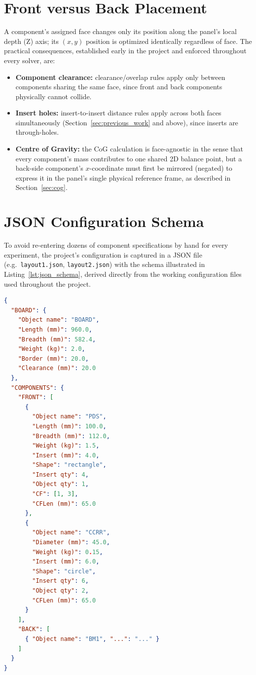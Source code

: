 \documentclass[11pt,a4paper,oneside]{report}
\begin{document}
\section{Front versus Back Placement}
A component's assigned face changes only its position along the panel's local depth (Z) axis; its $(x, y)$ position is optimized identically regardless of face. The practical consequences, established early in the project and enforced throughout every solver, are:
\begin{itemize}
    \item \textbf{Component clearance:} clearance/overlap rules apply only between components sharing the same face, since front and back components physically cannot collide.
    \item \textbf{Insert holes:} insert-to-insert distance rules apply across both faces simultaneously (Section~\ref{sec:previous_work} and above), since inserts are through-holes.
    \item \textbf{Centre of Gravity:} the CoG calculation is face-agnostic in the sense that every component's mass contributes to one shared 2D balance point, but a back-side component's $x$-coordinate must first be mirrored (negated) to express it in the panel's single physical reference frame, as described in Section~\ref{sec:cog}.
\end{itemize}

\section{JSON Configuration Schema}
\label{sec:json_schema}
To avoid re-entering dozens of component specifications by hand for every experiment, the project's configuration is captured in a JSON file (e.g.\ \texttt{layout1.json}, \texttt{layout2.json}) with the schema illustrated in Listing~\ref{lst:json_schema}, derived directly from the working configuration files used throughout the project.

\begin{lstlisting}[language=json, caption={Excerpt of the JSON board/component configuration schema (from \texttt{DE/layout1.json})}, label={lst:json_schema}]
{
  "BOARD": {
    "Object name": "BOARD",
    "Length (mm)": 960.0,
    "Breadth (mm)": 582.4,
    "Weight (kg)": 2.0,
    "Border (mm)": 20.0,
    "Clearance (mm)": 20.0
  },
  "COMPONENTS": {
    "FRONT": [
      {
        "Object name": "PDS",
        "Length (mm)": 100.0,
        "Breadth (mm)": 112.0,
        "Weight (kg)": 1.5,
        "Insert (mm)": 4.0,
        "Shape": "rectangle",
        "Insert qty": 4,
        "Object qty": 1,
        "CF": [1, 3],
        "CFLen (mm)": 65.0
      },
      {
        "Object name": "CCRR",
        "Diameter (mm)": 45.0,
        "Weight (kg)": 0.15,
        "Insert (mm)": 6.0,
        "Shape": "circle",
        "Insert qty": 6,
        "Object qty": 2,
        "CFLen (mm)": 65.0
      }
    ],
    "BACK": [
      { "Object name": "BM1", "...": "..." }
    ]
  }
}
\end{lstlisting}
\end{document}
